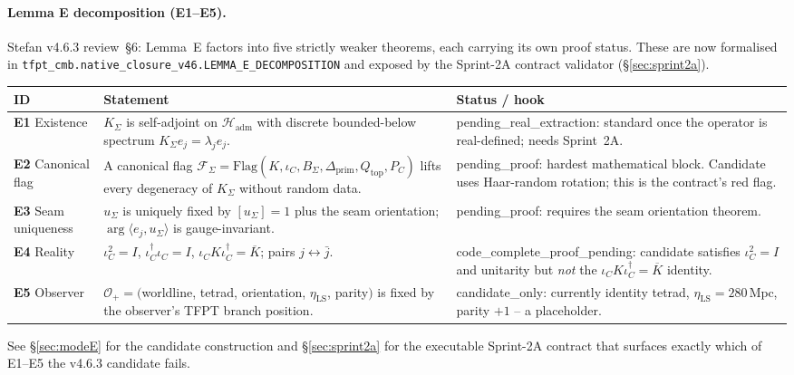 \documentclass[11pt,a4paper]{article}
\begin{document}
\paragraph{Lemma E decomposition (E1--E5).}
Stefan v4.6.3 review~\S6: Lemma~E factors into five strictly weaker
theorems, each carrying its own proof status.  These are now
formalised in
\texttt{tfpt\_cmb.native\_closure\_v46.LEMMA\_E\_DECOMPOSITION}
and exposed by the Sprint-2A contract validator
(\S\ref{sec:sprint2a}).
\begin{center}
\renewcommand{\arraystretch}{1.13}
\begin{tabularx}{\textwidth}{@{}p{}p{}Y@{}}
\toprule
\textbf{ID} & \textbf{Statement} & \textbf{Status / hook} \\
\midrule
\textbf{E1} Existence
& \(K_\Sigma\) is self-adjoint on \(\mathcal H_{\mathrm{adm}}\) with
discrete bounded-below spectrum \(K_\Sigma e_j=\lambda_j e_j\).
& \textsf{pending\_real\_extraction}: standard once the operator is
real-defined; needs Sprint~2A.\\
\textbf{E2} Canonical flag
& A canonical flag
\(\mathcal F_\Sigma=\mathrm{Flag}(K,\iota_C,B_\Sigma,\Delta_{\mathrm{prim}},Q_{\mathrm{top}},P_C)\)
lifts every degeneracy of \(K_\Sigma\) without random data.
& \textsf{pending\_proof}: hardest mathematical block.  Candidate
uses Haar-random rotation; this is the contract's red flag.\\
\textbf{E3} Seam uniqueness
& \(u_\Sigma\) is uniquely fixed by \([u_\Sigma]=1\) plus the seam
orientation; \(\arg\langle e_j,u_\Sigma\rangle\) is gauge-invariant.
& \textsf{pending\_proof}: requires the seam orientation theorem.\\
\textbf{E4} Reality
& \(\iota_C^2=I\), \(\iota_C^\dagger\iota_C=I\),
\(\iota_C K \iota_C^\dagger=\overline{K}\); pairs \(j\leftrightarrow\bar j\).
& \textsf{code\_complete\_proof\_pending}: candidate satisfies
\(\iota_C^2=I\) and unitarity but \emph{not} the
\(\iota_C K \iota_C^\dagger=\overline{K}\) identity.\\
\textbf{E5} Observer
& \(\mathcal O_+=(\)worldline, tetrad, orientation, \(\eta_{\mathrm{LS}}\), parity\()\) is fixed by the observer's TFPT branch position.
& \textsf{candidate\_only}: currently identity tetrad,
\(\eta_{\mathrm{LS}}=280\,\mathrm{Mpc}\), parity \(+1\) -- a placeholder.\\
\bottomrule
\end{tabularx}
\end{center}
See \S\ref{sec:modeE} for the candidate construction and \S\ref{sec:sprint2a}
for the executable Sprint-2A contract that surfaces exactly which of
E1--E5 the v4.6.3 candidate fails.
\end{document}
